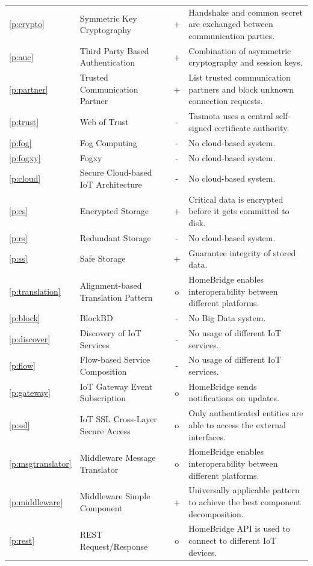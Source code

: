 \begin{landscape}
\begin{longtable}[c]{llcp{12cm}}
	\ref{p:crypto} & Symmetric Key Cryptography & + & Handshake and common secret are exchanged between communication parties. \\
	\ref{p:auc} & Third Party Based Authentication & + & Combination of asymmetric cryptography and session keys. \\
	\ref{p:partner} & Trusted Communication Partner & + & List trusted communication partners and block unknown connection requests. \\
	\ref{p:trust} & Web of Trust & - & Tasmota uses a central self-signed certificate authority. \\
	\hline
	\ref{p:fog} & Fog Computing & - & No cloud-based system. \\
	\ref{p:fogxy} & Fogxy & - & No cloud-based system. \\
	\ref{p:cloud} & Secure Cloud-based IoT Architecture & - & No cloud-based system. \\
	\hline
	\ref{p:es} & Encrypted Storage & + & Critical data is encrypted before it gets committed to disk. \\
	\ref{p:rs} & Redundant Storage & - & No cloud-based system. \\
	\ref{p:ss} & Safe Storage & + & Guarantee integrity of stored data. \\
	\hline
	\ref{p:translation} & Alignment-based Translation Pattern & o & HomeBridge enables interoperability between different platforms. \\
	\ref{p:block} & BlockBD & - & No Big Data system. \\
	\ref{p:discover} & Discovery of IoT Services & - & No usage of different IoT services. \\
	\ref{p:flow} & Flow-based Service Composition & - & No usage of different IoT services. \\
	\ref{p:gateway} & IoT Gateway Event Subscription & o & HomeBridge sends notifications on updates. \\
	\hline
	\ref{p:ssl} & IoT SSL Cross-Layer Secure Access & o & Only authenticated entities are able to access the external interfaces. \\
	\ref{p:msgtranslator} & Middleware Message Translator & o & HomeBridge enables interoperability between different platforms. \\
	\ref{p:middleware} & Middleware Simple Component & + & Universally applicable pattern to achieve the best component decomposition. \\
	\ref{p:rest} & REST Request/Response & o & HomeBridge API is used to connect to different IoT devices. \\

\end{longtable}
\end{landscape}
